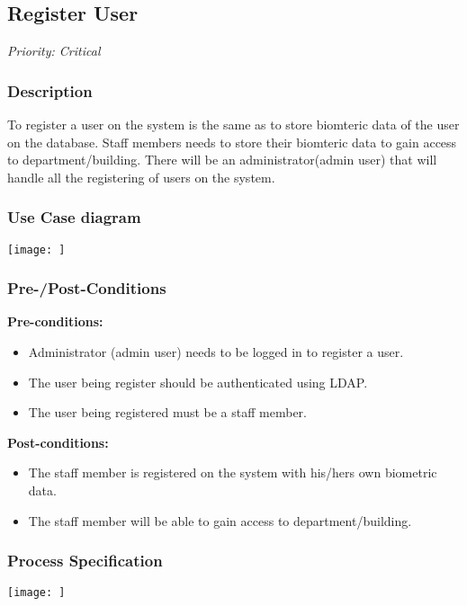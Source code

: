\subsection{Register User}
\textit{Priority: Critical} \\

\subsubsection{Description}
To register a user on the system is the same as to store biomteric data of the user on the database.
Staff members needs to store their biomteric data to gain access to department/building. There will be an administrator(admin user) that will handle all the registering of users on the system.

\subsubsection{Use Case diagram}
\texttt{[image: ]}

\subsubsection{Pre-/Post-Conditions}
\textbf{Pre-conditions:} 
	\begin{itemize}
		\item Administrator (admin user) needs to be logged in to register a user.
		\item The user being register should be authenticated using LDAP. 
		\item The user being registered must be a staff member.
	\end{itemize}
\textbf{ Post-conditions:} 
	\begin{itemize}
		\item The staff member is registered on the system with his/hers own biometric data.
		\item The staff member will be able to gain access to department/building.
	\end{itemize}
	
\subsubsection{Process Specification}
	\texttt{[image: ]}	
